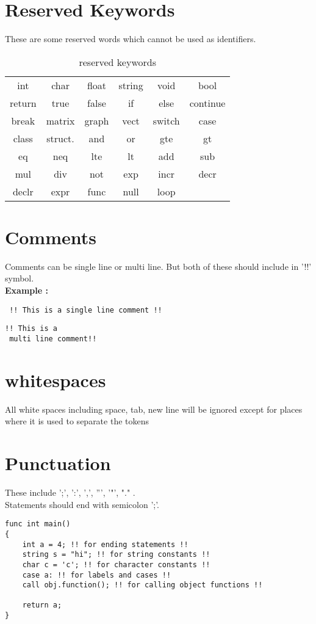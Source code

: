 \documentclass[journal, 18pt]{report}
\begin{document}
 \section{Reserved Keywords}
 These are some reserved words which cannot be used as identifiers.\\
 \begin{table}[!h]
     \centering
     \begin{tabular}{cccccc}
         int& char& float& string&void& bool\\
         return& true& false& if& else& continue\\
         break& matrix& graph& vect& switch& case\\
         class& struct.& and & or& gte& gt\\
         eq& neq& lte& lt& add& sub\\
         mul& div&not& exp& incr& decr\\
         declr& expr& func& null & loop &  \\
     \end{tabular}
     \caption{reserved keywords}
     \label{tab:my_label}
 \end{table}
  \section{Comments}
 Comments can be single line or multi line. But both of these should include in '!!' symbol.\\
 \textbf{Example :}
 \begin{lstlisting}
 !! This is a single line comment !!
\end{lstlisting}
\begin{lstlisting}
!! This is a 
 multi line comment!!
\end{lstlisting}
\section{whitespaces}
All white spaces including space, tab, new line will be ignored except for places where it is used to separate the tokens\\
\section{Punctuation}

These include ';', ':', ',', ''', '"', "." .\\
Statements should end with semicolon ';'.\\
\begin{lstlisting}
func int main()
{
    int a = 4; !! for ending statements !!
    string s = "hi"; !! for string constants !!
    char c = 'c'; !! for character constants !!
    case a: !! for labels and cases !!
    call obj.function(); !! for calling object functions !!

    return a;
}
\end{lstlisting}
\end{document}
